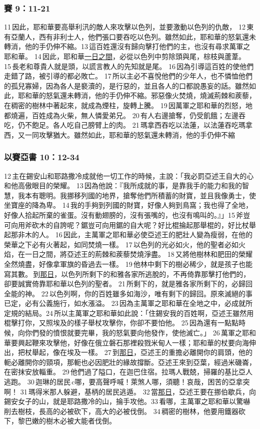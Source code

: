 \subsubsection{賽 9：11-21}
11 因此，耶和華要高舉利汛的敵人來攻擊以色列，並要激動以色列的仇敵， 12 東有亞蘭人，西有非利士人，他們張口要吞吃以色列。雖然如此，耶和華的怒氣還未轉消，他的手仍伸不縮。13 這百姓還沒有歸向擊打他們的主，也沒有尋求萬軍之耶和華。 14 因此，耶和華\underline{一日之間}，必從以色列中剪除頭與尾，棕枝與蘆葦。 15 長老和尊貴人就是頭，以謊言教人的先知就是尾。 16 因為引導這百姓的使他們走錯了路，被引導的都必敗亡。 17 所以主必不喜悅他們的少年人，也不憐恤他們的孤兒寡婦，因為各人是褻瀆的，是行惡的，並且各人的口都說愚妄的話。雖然如此，耶和華的怒氣還未轉消，他的手仍伸不縮。邪惡像火焚燒，燒滅荊棘和蒺藜，在稠密的樹林中著起來，就成為煙柱，旋轉上騰。 19 因萬軍之耶和華的烈怒，地都燒遍，百姓成為火柴，無人憐愛弟兄。 20 有人右邊搶奪，仍受飢餓；左邊吞吃，仍不飽足。各人吃自己膀臂上的肉。 21 瑪拿西吞吃以法蓮，以法蓮吞吃瑪拿西，又一同攻擊猶大。雖然如此，耶和華的怒氣還未轉消，他的手仍伸不縮

\subsubsection{以賽亞書 10：12-34}
 12 主在錫安山和耶路撒冷成就他一切工作的時候，主說：「我必罰亞述王自大的心和他高傲眼目的榮耀。 13 因為他說：『我所成就的事，是靠我手的能力和我的智慧，我本有聰明。我挪移列國的地界，搶奪他們所積蓄的財寶，並且我像勇士，使坐寶座的降為卑。 14 我的手夠到列國的財寶，好像人夠到鳥窩；我也得了全地，好像人拾起所棄的雀蛋。沒有動翅膀的，沒有張嘴的，也沒有鳴叫的。』」15 斧豈可向用斧砍木的自誇呢？鋸豈可向用鋸的自大呢？好比棍掄起那舉棍的，好比杖舉起那非木的人。 16 因此，主萬軍之耶和華必使亞述王的肥壯人變為瘦弱，在他的榮華之下必有火著起，如同焚燒一樣。 17 以色列的光必如火，他的聖者必如火焰，在一日之間，將亞述王的荊棘和蒺藜焚燒淨盡。 18 又將他樹林和肥田的榮耀全然燒盡，好像拿軍旗的昏過去一樣。 19 他林中剩下的樹必稀少，就是孩子也能寫其數。 到\underline{那日}，以色列所剩下的和雅各家所逃脫的，不再倚靠那擊打他們的，卻要誠實倚靠耶和華以色列的聖者。 21 所剩下的，就是雅各家所剩下的，必歸回全能的神。 22 以色列啊，你的百姓雖多如海沙，唯有剩下的歸回。原來滅絕的事已定，必有公義施行，如水漲溢。 23 因為主萬軍之耶和華在全地之中，必成就所定規的結局。24 所以主萬軍之耶和華如此說：「住錫安我的百姓啊，亞述王雖然用棍擊打你，又照埃及的樣子舉杖攻擊你，你卻不要怕他。 25 因為還有一點點時候，向你們發的憤恨就要完畢，我的怒氣要向他發作，使他滅亡。」 26 萬軍之耶和華要興起鞭來攻擊他，好像在俄立磐石那裡殺戮米甸人一樣；耶和華的杖要向海伸出，把杖舉起，像在埃及一樣。 27 到\underline{那日}，亞述王的重擔必離開你的肩頭，他的軛必離開你的頸項，那軛也必因肥壯的緣故撐斷。亞述王來到亞葉，經過米磯崙，在密抹安放輜重。 29 他們過了隘口，在迦巴住宿。拉瑪人戰兢，掃羅的基比亞人逃跑。 30 迦琳的居民 c哪，要高聲呼喊！萊煞人哪，須聽！哀哉，困苦的亞拿突啊！ 31 瑪得米那人躲避，基柄的居民逃遁。 32 當\underline{那日}，亞述王要在挪伯歇兵，向錫安女子的山，就是耶路撒冷的山，掄手攻他。33 看哪，主萬軍之耶和華以驚嚇削去樹枝，長高的必被砍下，高大的必被伐倒。 34 稠密的樹林，他要用鐵器砍下，黎巴嫩的樹木必被大能者伐倒。

